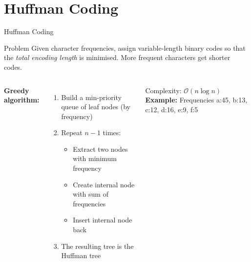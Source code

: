 \documentclass[aspectratio=169]{beamer}
\begin{document}
\section{Huffman Coding}

\begin{frame}[shrink=12]{Huffman Coding}
  \begin{block}{Problem}
    Given character frequencies, assign variable-length binary codes
    so that the \emph{total encoding length} is minimised.
    More frequent characters get shorter codes.
  \end{block}
  \vspace{0.3em}
  \begin{columns}[T]
      \textbf{Greedy algorithm:}
      \begin{enumerate}
        \item Build a min-priority queue of leaf nodes (by frequency)
        \item Repeat $n-1$ times:
          \begin{itemize}
            \item Extract two nodes with minimum frequency
            \item Create internal node with sum of frequencies
            \item Insert internal node back
          \end{itemize}
        \item The resulting tree is the Huffman tree
      \end{enumerate}
      Complexity: $\mathcal{O}(n\log n)$
      \textbf{Example:} Frequencies a:45, b:13, c:12, d:16, e:9, f:5


\end{columns}
\end{frame}
\end{document}
